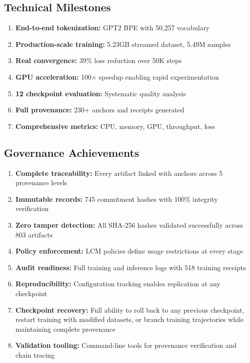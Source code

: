 \documentclass[11pt,a4paper]{article}
\begin{document}
\subsection{Technical Milestones}
\begin{enumerate}
    \item \textbf{End-to-end tokenization:} GPT2 BPE with 50,257 vocabulary
    \item \textbf{Production-scale training:} 5.23GB streamed dataset, 5.49M samples
    \item \textbf{Real convergence:} 39\% loss reduction over 50K steps
    \item \textbf{GPU acceleration:} 100× speedup enabling rapid experimentation
    \item \textbf{12 checkpoint evaluation:} Systematic quality analysis
    \item \textbf{Full provenance:} 230+ anchors and receipts generated
    \item \textbf{Comprehensive metrics:} CPU, memory, GPU, throughput, loss
\end{enumerate}

\subsection{Governance Achievements}
\begin{enumerate}
    \item \textbf{Complete traceability:} Every artifact linked with anchors across 5 provenance levels
    \item \textbf{Immutable records:} 745 commitment hashes with 100\% integrity verification
    \item \textbf{Zero tamper detection:} All SHA-256 hashes validated successfully across 803 artifacts
    \item \textbf{Policy enforcement:} LCM policies define usage restrictions at every stage
    \item \textbf{Audit readiness:} Full training and inference logs with 518 training receipts
    \item \textbf{Reproducibility:} Configuration tracking enables replication at any checkpoint
    \item \textbf{Checkpoint recovery:} Full ability to roll back to any previous checkpoint, restart training with modified datasets, or branch training trajectories while maintaining complete provenance
    \item \textbf{Validation tooling:} Command-line tools for provenance verification and chain tracing
\end{enumerate}
\end{document}
